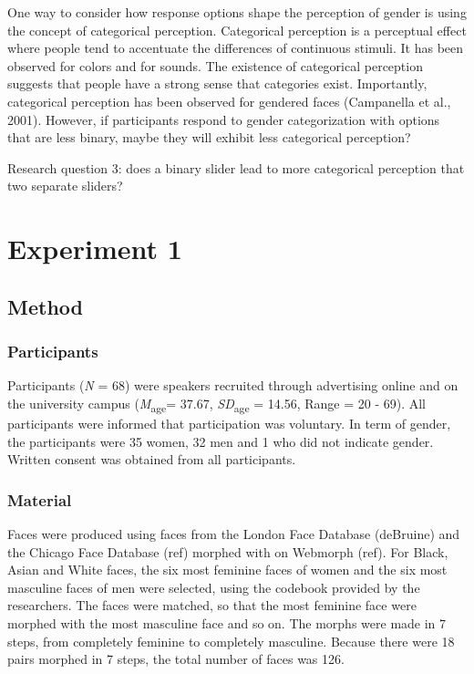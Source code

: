 \documentclass[
  man]{apa7}
\begin{document}
One way to consider how response options shape the perception of gender is using the concept of categorical perception. Categorical perception is a perceptual effect where people tend to accentuate the differences of continuous stimuli. It has been observed for colors and for sounds. The existence of categorical perception suggests that people have a strong sense that categories exist. Importantly, categorical perception has been observed for gendered faces (Campanella et al., 2001). However, if participants respond to gender categorization with options that are less binary, maybe they will exhibit less categorical perception?

Research question 3: does a binary slider lead to more categorical perception that two separate sliders?

\hypertarget{experiment-1}{%
\section{Experiment 1}\label{experiment-1}}

\hypertarget{method}{%
\subsection{Method}\label{method}}

\hypertarget{participants}{%
\subsubsection{Participants}\label{participants}}

Participants (\emph{N} = 68) were speakers recruited through advertising online and on the university campus (\emph{M}\textsubscript{age}= 37.67, \emph{SD}\textsubscript{age} = 14.56, Range = 20 - 69). All participants were informed that participation was voluntary. In term of gender, the participants were 35 women, 32 men and 1 who did not indicate gender. Written consent was obtained from all participants.

\hypertarget{material}{%
\subsubsection{Material}\label{material}}

Faces were produced using faces from the London Face Database (deBruine) and the Chicago Face Database (ref) morphed with on Webmorph (ref). For Black, Asian and White faces, the six most feminine faces of women and the six most masculine faces of men were selected, using the codebook provided by the researchers. The faces were matched, so that the most feminine face were morphed with the most masculine face and so on. The morphs were made in 7 steps, from completely feminine to completely masculine. Because there were 18 pairs morphed in 7 steps, the total number of faces was 126.
\end{document}
